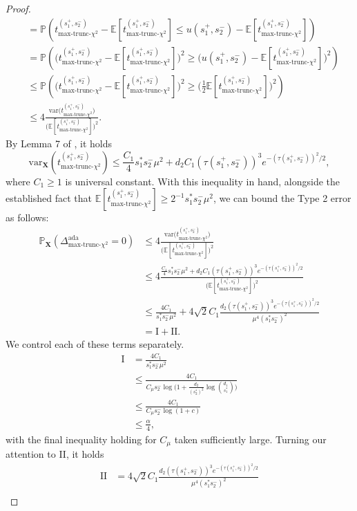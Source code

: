 \documentclass{article}
\newcommand{\X}{\mathbf{X}}
\newcommand{\EE}{\mathbb{E}}
\newcommand{\pr}{\mathbb{P}}
\newcommand{\var}{\textrm{var}}
\newcommand{\chisqmax}{\text{max-trunc-$\chi^2$}}
\theoremstyle{remark}
\begin{document}
\begin{proof}
\begin{align*}
    &= \pr\left(t_{\chisqmax}^{(s^+_1, s^-_2)} - \EE[t_{\chisqmax}^{(s^+_1, s^-_2)}]\leq u(s^+_1, s^-_2) - \EE[t_{\chisqmax}^{(s^+_1, s^-_2)}]\right) \\
    &= \pr\left(\bigg(t_{\chisqmax}^{(s^+_1, s^-_2)} - \EE[t_{\chisqmax}^{(s^+_1, s^-_2)}]\bigg)^2\geq \bigg(u(s^+_1, s^-_2) - \EE[t_{\chisqmax}^{(s^+_1, s^-_2)}]\bigg)^2\right) \\
    &\leq \pr\left(\bigg(t_{\chisqmax}^{(s^+_1, s^-_2)} - \EE[t_{\chisqmax}^{(s^+_1, s^-_2)}]\bigg)^2\geq \bigg(\frac12\EE[t_{\chisqmax}^{(s^+_1, s^-_2)}]\bigg)^2\right) \\
    &\leq 4\frac{\var \Big(t_{\chisqmax}^{(s^+_1, s^-_2)}\Big)}{\Big(\EE[t_{\chisqmax}^{(s^+_1, s^-_2)}]\Big)^2}.
\end{align*}
By Lemma 7 of \cite{liu2021minimax}, it holds
\[\var_\X(t^{(s_1^+, s_2^-)}_{\chisqmax}) \leq\frac{C_1}{4}s^*_1s^-_2\mu^2 + d_2C_1 (\tau(s_1^+, s_2^-))^3e^{-(\tau(s_1^+, s_2^-))^2/2},\]
where $C_1 \geq 1$ is universal constant. With this inequality in hand, alongside the established fact that $\EE[t_{\chisqmax}^{(s^+_1, s^-_2)}] \geq 2^{-1}s_1^*s_2^-\mu^2$, we can bound the Type 2 error as follows:
\begin{align*}
    \pr_\X \left(\Delta^{\text{ada}}_{\chisqmax} = 0\right) &\leq 4\frac{\var \Big(t_{\chisqmax}^{(s^+_1, s^-_2)}\Big)}{\Big(\EE[t_{\chisqmax}^{(s^+_1, s^-_2)}]\Big)^2} \\
    &\leq 4\frac{\frac{C_1}{4}s^*_1s^-_2\mu^2 + d_2C_1 (\tau(s_1^+, s_2^-))^3e^{-(\tau(s_1^+, s_2^-))^2/2}}{\Big(\EE[t_{\chisqmax}^{(s^+_1, s^-_2)}]\Big)^2} \\
    &\leq \frac{4C_1}{s_1^*s_2^-\mu^2} + 4\sqrt{2}C_1\frac{d_2(\tau(s_1^+, s_2^-))^3e^{-(\tau(s_1^+, s_2^-))^2/2}}{\mu^4(s_1^*s_2^-)^2} \\
    &= \text{I} + \text{II}.
\end{align*}
We control each of these terms separately.
\begin{align*}
    \text{I} &= \frac{4C_1}{s_1^*s_2^-\mu^2} \\
    &\leq \frac{4C_1}{C_\mu s_2^-\log\Big(1 + \frac{d_2}{(s_2^*)^2}\log {d_1 \choose s_1^*}\Big)} \\
    &\leq \frac{4C_1}{C_\mu s_2^-\log(1 + c)} \\
    &\leq \frac{\alpha}{4},
\end{align*}
with the final inequality holding for $C_\mu$ taken sufficiently large. Turning our attention to II, it holds
\begin{align*}
    \text{II} &= 4\sqrt{2}C_1\frac{d_2(\tau(s_1^+, s_2^-))^3e^{-(\tau(s_1^+, s_2^-))^2/2}}{\mu^4(s_1^*s_2^-)^2} \\

\end{align*}
\end{proof}
\end{document}
